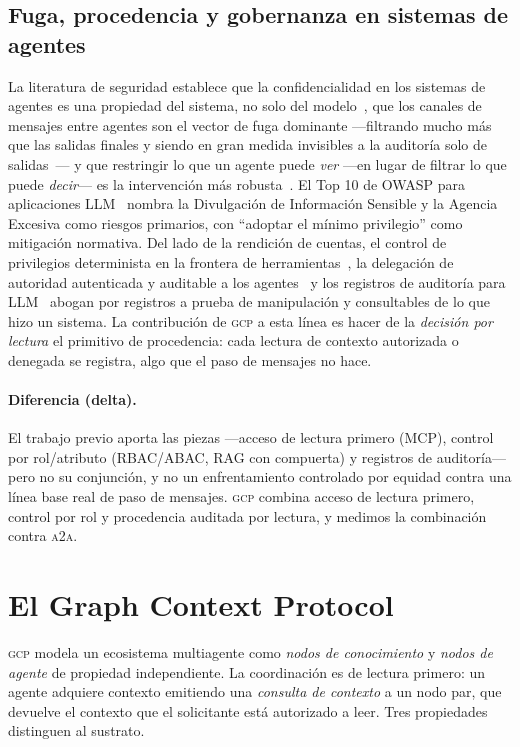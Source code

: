 \documentclass[10pt,twocolumn,letterpaper]{article}
\newcommand{\gcp}{\textsc{gcp}}
\newcommand{\ata}{\textsc{a2a}}
\begin{document}
\subsection{Fuga, procedencia y gobernanza en sistemas de agentes}
La literatura de seguridad establece que la confidencialidad en los sistemas de
agentes es una propiedad del sistema, no solo del modelo~\citep{evertz2024whispers},
que los canales de mensajes entre agentes son el vector de fuga dominante
---filtrando mucho más que las salidas finales y siendo en gran medida invisibles a
la auditoría solo de salidas~\citep{elyagoubi2026agentleak}--- y que restringir lo
que un agente puede \emph{ver} ---en lugar de filtrar lo que puede \emph{decir}---
es la intervención más robusta~\citep{bagdasarian2024airgap}. El Top 10 de OWASP
para aplicaciones LLM~\citep{owasp2025} nombra la Divulgación de Información
Sensible y la Agencia Excesiva como riesgos primarios, con ``adoptar el mínimo
privilegio'' como mitigación normativa. Del lado de la rendición de cuentas, el
control de privilegios determinista en la frontera de herramientas~\citep{shi2025progent},
la delegación de autoridad autenticada y auditable a los
agentes~\citep{south2025delegation} y los registros de auditoría para
LLM~\citep{ojewale2025audit} abogan por registros a prueba de manipulación y
consultables de lo que hizo un sistema. La contribución de \gcp{} a esta línea es
hacer de la \emph{decisión por lectura} el primitivo de procedencia: cada lectura
de contexto autorizada o denegada se registra, algo que el paso de mensajes no
hace.

\paragraph{Diferencia (delta).} El trabajo previo aporta las piezas ---acceso de
lectura primero (MCP), control por rol/atributo (RBAC/ABAC, RAG con compuerta) y
registros de auditoría--- pero no su conjunción, y no un enfrentamiento controlado
por equidad contra una línea base real de paso de mensajes. \gcp{} combina acceso
de lectura primero, control por rol y procedencia auditada por lectura, y medimos
la combinación contra \ata{}.

\section{El Graph Context Protocol}
\label{sec:arch}

\gcp{} modela un ecosistema multiagente como \emph{nodos de conocimiento} y
\emph{nodos de agente} de propiedad independiente. La coordinación es de lectura
primero: un agente adquiere contexto emitiendo una \emph{consulta de contexto} a
un nodo par, que devuelve el contexto que el solicitante está autorizado a leer.
Tres propiedades distinguen al sustrato.
\end{document}
